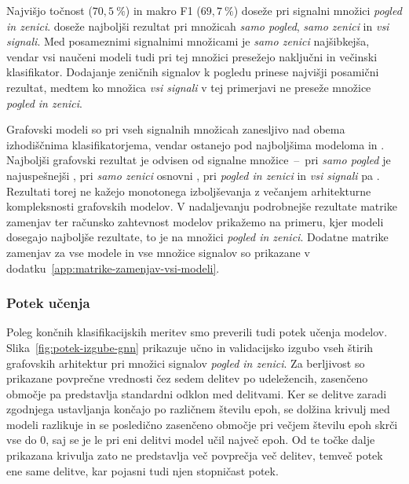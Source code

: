 Najvišjo točnost ($70{,}5~\%$) in makro F1 ($69{,}7~\%$) doseže  pri signalni množici \emph{pogled in zenici}.
 doseže najboljši rezultat pri množicah \emph{samo pogled}, \emph{samo zenici} in \emph{vsi signali}.
Med posameznimi signalnimi množicami je \emph{samo zenici} najšibkejša, vendar vsi naučeni modeli tudi pri tej množici presežejo naključni in večinski klasifikator.
Dodajanje zeničnih signalov k pogledu prinese najvišji posamični rezultat, medtem ko množica \emph{vsi signali} v tej primerjavi ne preseže množice \emph{pogled in zenici}.

Grafovski modeli so pri vseh signalnih množicah zanesljivo nad obema izhodiščnima klasifikatorjema, vendar ostanejo pod najboljšima modeloma  in .
Najboljši grafovski rezultat je odvisen od signalne množice~--~pri \emph{samo pogled} je najuspešnejši , pri \emph{samo zenici} osnovni , pri \emph{pogled in zenici} in \emph{vsi signali} pa .
Rezultati torej ne kažejo monotonega izboljševanja z večanjem arhitekturne kompleksnosti grafovskih modelov.
V nadaljevanju podrobnejše rezultate matrike zamenjav ter računsko zahtevnost modelov prikažemo na primeru, kjer modeli dosegajo najboljše rezultate, to je na množici \emph{pogled in zenici}.
Dodatne matrike zamenjav za vse modele in vse množice signalov so prikazane v dodatku~\ref{app:matrike-zamenjav-vsi-modeli}.
\newpage



\subsubsection*{Potek učenja}

\enlargethispage{2\baselineskip}
Poleg končnih klasifikacijskih meritev smo preverili tudi potek učenja modelov.
Slika~\ref{fig:potek-izgube-gnn} prikazuje učno in validacijsko izgubo vseh štirih grafovskih arhitektur pri množici signalov \emph{pogled in zenici}.
Za berljivost so prikazane povprečne vrednosti čez sedem delitev po udeležencih, zasenčeno območje pa predstavlja standardni odklon med delitvami.
Ker se delitve zaradi zgodnjega ustavljanja končajo po različnem številu epoh, se dolžina krivulj med modeli razlikuje in se posledično zasenčeno območje pri večjem številu epoh skrči vse do 0, saj se je le pri eni delitvi model učil največ epoh.
Od te točke dalje prikazana krivulja zato ne predstavlja več povprečja več delitev, temveč potek ene same delitve, kar pojasni tudi njen stopničast potek.

